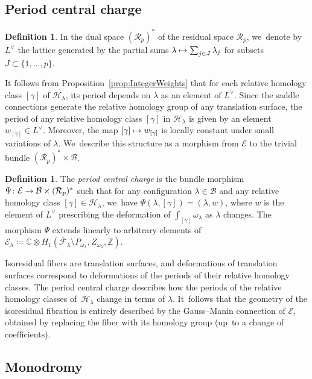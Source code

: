 \documentclass[11pt]{article}
\newcommand{\Subsection}{\subsection}
\newcommand\mto{\mathchoice{\longmapsto}{\mapsto}{\mapsto}{\mapsto}}
\newcommand\ZZ{{\mathbb Z}}
\newcommand\calH{{\mathcal H}}
\newcommand\calE{{\mathcal E}}
\theoremstyle{definition}
\newtheorem{defn}[thm]{Definition}
\begin{document}
\Subsection{Period central charge}

\begin{defn}\label{defn:DualLattice}
In the dual space $(\mathcal{R}_{p})^{\ast}$ of the residual space $\mathcal{R}_{p}$, we~denote by $L^{\vee}$ the lattice generated by the partial sums $\lambda \mto \sum_{j \in J} \lambda_j$ for subsets $J\subset \{1,\ldots,p\}$.
\end{defn}

It follows from Proposition~\ref{prop:IntegerWeights} that for each relative homology class $[\gamma]$ of $\calH_{\lambda}$, its period depends on $\lambda$ as an element of $L^{\vee}$. Since the saddle connections generate the relative homology group of any translation surface, the period of any relative homology class $[\gamma]$ in $\calH_{\lambda}$ is given by an element $w_{[\gamma]}\in L^{\vee}$. Moreover, the map $[\gamma]\mto w_{[\gamma]}$ is locally constant under small variations of $\lambda$. We~describe this structure as a morphism from $\mathcal{E}$ to the trivial bundle $(\mathcal{R}_{p})^{\ast} \times \mathcal{B}$.

\begin{defn}
The \textit{period central charge} is the bundle morphism $\Psi\colon\mathcal{E} \to \mathcal{B}\times\nobreak (\mathcal{R}_{p})^{\ast} $ such that for any configuration $\lambda \in \mathcal{B}$ and any relative homology class $[\gamma] \in \calH_{\lambda}$, we~have $\Psi(\lambda,[\gamma])=(\lambda,w)$, where $w$ is the element of $L^{\vee}$ prescribing the deformation of $\int_{[\gamma]} \omega_{\lambda}$ as $\lambda$ changes. The morphism $\Psi$ extends linearly to arbitrary elements of $\mathcal{E}_{\lambda} \coloneqq \mathbb{C} \otimes H_{1}(\overline{\mathcal{F}}_{\lambda} \setminus P_{\omega_{\lambda}}, Z_{\omega_{\lambda}},\ZZ)$.
\end{defn}

Isoresidual fibers are translation surfaces, and deformations of translation surfaces correspond to deformations of the periods of their relative homology classes. The period central charge describes how the periods of the relative homology classes of~$\calH_{\lambda}$ change in terms of $\lambda$. It~follows that the geometry of the isoresidual fibration is entirely described by the Gauss--Manin connection of $\calE$, obtained by replacing the fiber with its homology group (up~to a change of coefficients).

\subsection{Monodromy}\label{sub:Monodromy}
\end{document}
